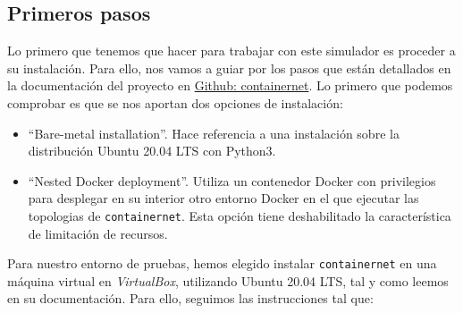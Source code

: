 \documentclass[a4paper, oneside, 12pt]{book}
\begin{document}
	\pagebreak
	
	\subsection{Primeros pasos}
	\noindent Lo primero que tenemos que hacer para trabajar con este simulador es proceder a su instalación. Para ello, nos vamos a guiar por los pasos que están detallados en la documentación del proyecto en \href{https://containernet.github.io/#installation}{Github: containernet}. Lo primero que podemos comprobar es que se nos aportan dos opciones de instalación:
	\begin{itemize}
		\item ``Bare-metal installation''. Hace referencia a una instalación sobre la distribución Ubuntu 20.04 LTS con Python3.
		
		\item ``Nested Docker deployment''. Utiliza un contenedor Docker con privilegios para desplegar en su interior otro entorno Docker en el que ejecutar las topologias de \texttt{containernet}. Esta opción tiene deshabilitado la característica de limitación de recursos.
	\end{itemize}

	\noindent Para nuestro entorno de pruebas, hemos elegido instalar \texttt{containernet} en una máquina virtual en \textit{VirtualBox}, utilizando Ubuntu 20.04 LTS, tal y como leemos en su documentación. Para ello, seguimos las instrucciones tal que:
	
\end{document}
